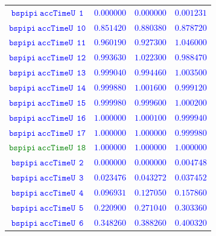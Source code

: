 \documentclass[10pt,a4paper]{article}
\begin{document}
\begin{table}[h!]
{\begin{tabular}{cccc}
\textcolor{blue}{$\mathtt{bspipi~accTimeU~~1}$} & \textcolor{blue}{$0.000000$}& \textcolor{blue}{$0.000000$}& \textcolor{blue}{$0.001231$}\\
\textcolor{blue}{$\mathtt{bspipi~accTimeU~~10}$} & \textcolor{blue}{$0.851420$}& \textcolor{blue}{$0.880380$}& \textcolor{blue}{$0.878720$}\\
\textcolor{blue}{$\mathtt{bspipi~accTimeU~~11}$} & \textcolor{blue}{$0.960190$}& \textcolor{blue}{$0.927300$}& \textcolor{blue}{$1.046000$}\\
\textcolor{blue}{$\mathtt{bspipi~accTimeU~~12}$} & \textcolor{blue}{$0.993630$}& \textcolor{blue}{$1.022300$}& \textcolor{blue}{$0.988470$}\\
\textcolor{blue}{$\mathtt{bspipi~accTimeU~~13}$} & \textcolor{blue}{$0.999040$}& \textcolor{blue}{$0.994460$}& \textcolor{blue}{$1.003500$}\\
\textcolor{blue}{$\mathtt{bspipi~accTimeU~~14}$} & \textcolor{blue}{$0.999880$}& \textcolor{blue}{$1.001600$}& \textcolor{blue}{$0.999120$}\\
\textcolor{blue}{$\mathtt{bspipi~accTimeU~~15}$} & \textcolor{blue}{$0.999980$}& \textcolor{blue}{$0.999600$}& \textcolor{blue}{$1.000200$}\\
\textcolor{blue}{$\mathtt{bspipi~accTimeU~~16}$} & \textcolor{blue}{$1.000000$}& \textcolor{blue}{$1.000100$}& \textcolor{blue}{$0.999940$}\\
\textcolor{blue}{$\mathtt{bspipi~accTimeU~~17}$} & \textcolor{blue}{$1.000000$}& \textcolor{blue}{$1.000000$}& \textcolor{blue}{$0.999980$}\\
\textcolor{Green}{$\mathtt{bspipi~accTimeU~~18}$} & \textcolor{blue}{$1.000000$}& \textcolor{blue}{$1.000000$}& \textcolor{blue}{$1.000000$}\\
\textcolor{blue}{$\mathtt{bspipi~accTimeU~~2}$} & \textcolor{blue}{$0.000000$}& \textcolor{blue}{$0.000000$}& \textcolor{blue}{$0.004748$}\\
\textcolor{blue}{$\mathtt{bspipi~accTimeU~~3}$} & \textcolor{blue}{$0.023476$}& \textcolor{blue}{$0.043272$}& \textcolor{blue}{$0.037452$}\\
\textcolor{blue}{$\mathtt{bspipi~accTimeU~~4}$} & \textcolor{blue}{$0.096931$}& \textcolor{blue}{$0.127050$}& \textcolor{blue}{$0.157860$}\\
\textcolor{blue}{$\mathtt{bspipi~accTimeU~~5}$} & \textcolor{blue}{$0.220900$}& \textcolor{blue}{$0.271040$}& \textcolor{blue}{$0.303360$}\\
\textcolor{blue}{$\mathtt{bspipi~accTimeU~~6}$} & \textcolor{blue}{$0.348260$}& \textcolor{blue}{$0.388260$}& \textcolor{blue}{$0.400320$}\\

\end{tabular}}
\end{table}
\end{document}
